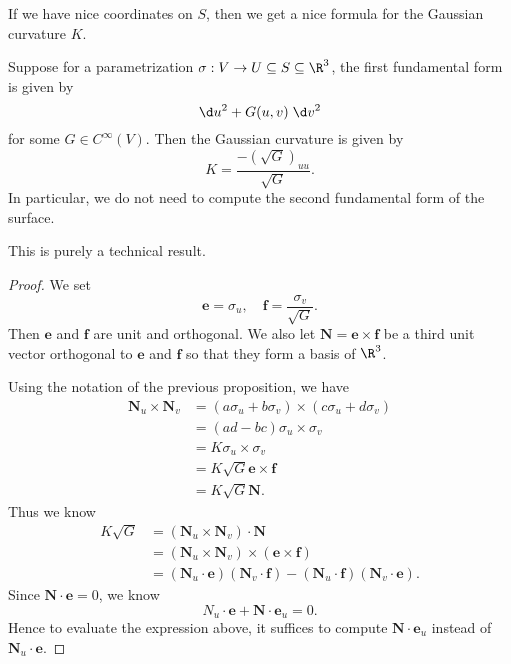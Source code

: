\documentclass[a4paper]{article}
\begin{document}
If we have nice coordinates on $S$, then we get a nice formula for the Gaussian curvature $K$.
\begin{thm}
  Suppose for a parametrization $\sigma: V \to U \subseteq S \subseteq \R^3$, the first fundamental form is given by
  \[
    \d u^2 + G (u, v) \;\d v^2
  \]
  for some $G \in C^{\infty}(V)$. Then the Gaussian curvature is given by
  \[
    K = \frac{-(\sqrt{G})_{uu}}{\sqrt{G}}.
  \]
  In particular, we do not need to compute the second fundamental form of the surface.
\end{thm}
This is purely a technical result.
\begin{proof}
  We set
  \[
    \mathbf{e} = \sigma_u,\quad \mathbf{f} = \frac{\sigma_v}{\sqrt{G}}.
  \]
  Then $\mathbf{e}$ and $\mathbf{f}$ are unit and orthogonal. We also let $\mathbf{N} = \mathbf{e} \times \mathbf{f}$ be a third unit vector orthogonal to $\mathbf{e}$ and $\mathbf{f}$ so that they form a basis of $\R^3$.

  Using the notation of the previous proposition, we have
  \begin{align*}
    \mathbf{N}_u \times \mathbf{N}_v &= (a \sigma_u + b \sigma_v)\times (c \sigma_u + d \sigma_v) \\
    &= (ad - bc) \sigma_u \times \sigma_v \\
    &= K \sigma_u \times \sigma_v\\
    &= K \sqrt{G} \mathbf{e} \times \mathbf{f}\\
    &= K \sqrt{G} \mathbf{N}.
  \end{align*}
  Thus we know
  \begin{align*}
    K \sqrt{G} &= (\mathbf{N}_u \times \mathbf{N}_v) \cdot \mathbf{N} \\
    &= (\mathbf{N}_u \times \mathbf{N}_v) \times (\mathbf{e}\times \mathbf{f})\\
    &= (\mathbf{N}_u \cdot \mathbf{e})(\mathbf{N}_v \cdot \mathbf{f}) - (\mathbf{N}_u \cdot \mathbf{f}) (\mathbf{N}_v \cdot \mathbf{e}).
  \end{align*}
  Since $\mathbf{N}\cdot \mathbf{e} = 0$, we know
  \[
    N_u \cdot \mathbf{e} + \mathbf{N}\cdot \mathbf{e}_u = 0.
  \]
  Hence to evaluate the expression above, it suffices to compute $\mathbf{N}\cdot \mathbf{e}_u$ instead of $\mathbf{N}_u \cdot \mathbf{e}$.


\end{proof}
\end{document}
